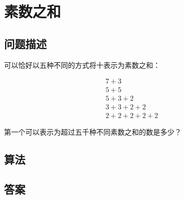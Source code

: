 \section{素数之和}\label{sec:problem77}
\subsection{问题描述}
\begin{tcolorbox}

	可以恰好以五种不同的方式将十表示为素数之和：

	\begin{align*}
		7 + 3         \\
		5 + 5         \\
		5 + 3 + 2     \\
		3 + 3 + 2 + 2 \\
		2 + 2 + 2 + 2 + 2
	\end{align*}

	第一个可以表示为超过五千种不同素数之和的数是多少？
\end{tcolorbox}

\subsection{算法}

\subsection{答案}
